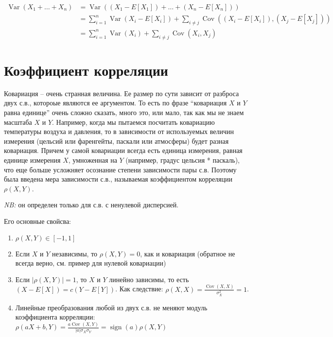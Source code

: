 \documentclass[12pt]{article}
\DeclareMathOperator{\Var}{Var}
\DeclareMathOperator{\Cov}{Cov}
\DeclareMathOperator{\sign}{sign}
\begin{document}
\begin{align*}
  \Var(X_1 + \dots +X_n) &= \Var((X_1 - E[X_1]) + \dots + (X_n - E[X_n])) \\
                         &= \sum_{i = 1}^n \Var(X_i - E[X_i]) + \sum_{i \ne j} \Cov((X_i - E[X_i]), (X_j - E[X_j])) \\
                         &= \sum_{i = 1}^n \Var(X_i) + \sum_{i \ne j} \Cov(X_i, X_j)
\end{align*}

\section{Коэффициент корреляции}

Ковариация -- очень странная величина. Ее размер по сути зависит от разброса двух с.в., котороые являются ее аргументом. То есть по фразе ``ковариация $X$ и $Y$ равна единице'' очень сложно сказать, много это, или мало, так как мы не знаем масштаба $X$ и $Y$. Например, когда мы пытаемся посчитать ковариацию температуры воздуха и давления, то в зависимости от используемых величин измерения (цельсий или фаренгейты, паскали или атмосферы) будет разная ковариация. Причем у самой ковариации всегда есть единица измерения, равная единице измерения $X$, умноженная на $Y$ (например, градус цельсия * паскаль), что еще больше усложняет осознание степени зависимости пары с.в. Поэтому была введена мера зависимости с.в., называемая коэффициентом корреляции $\rho(X, Y)$.

\begin{center}
\end{center}

\emph{NB:} он определен только для с.в. с ненулевой дисперсией. 

Его основные свойсва:

\begin{enumerate}
  \item $\rho(X, Y)\in [-1, 1]$
  \item Если $X$ и $Y$ независимы, то $\rho(X, Y) = 0$, как и ковариация (обратное не всегда верно, см. пример для нулевой ковариации)
  \item Если $|\rho(X, Y)| = 1$, то $X$ и $Y$ линейно зависимы, то есть $(X - E[X]) = c(Y - E[Y])$. Как следствие: $\rho(X, X) = \frac{\Cov(X, X)}{\sigma_X^2} = 1$.
  \item Линейные преобразования любой из двух с.в. не меняют модуль коэффициента корреляции: $\rho(aX + b, Y) = \frac{a\Cov(X, Y)}{|a|\sigma_X \sigma_Y} = \sign(a)\rho(X, Y)$
\end{enumerate}
\end{document}
